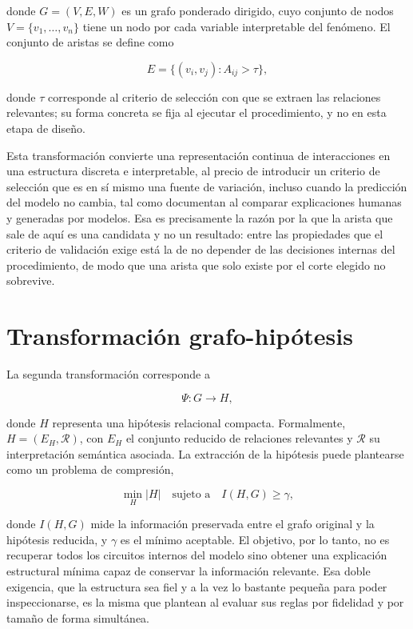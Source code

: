 donde $G = (V, E, W)$ es un grafo ponderado dirigido, cuyo conjunto de nodos $V = \{v_1, \dots, v_n\}$ tiene un nodo por cada variable interpretable del fenómeno. El conjunto de aristas se define como

\begin{equation}
E = \{(v_i, v_j) : A_{ij} > \tau\},
\end{equation}

donde $\tau$ corresponde al criterio de selección con que se extraen las relaciones relevantes; su forma concreta se fija al ejecutar el procedimiento, y no en esta etapa de diseño.

Esta transformación convierte una representación continua de interacciones en una estructura discreta e interpretable, al precio de introducir un criterio de selección que es en sí mismo una fuente de variación, incluso cuando la predicción del modelo no cambia, tal como documentan \textcite{bogaert2026variability} al comparar explicaciones humanas y generadas por modelos. Esa es precisamente la razón por la que la arista que sale de aquí es una candidata y no un resultado: entre las propiedades que el criterio de validación exige está la de no depender de las decisiones internas del procedimiento, de modo que una arista que solo existe por el corte elegido no sobrevive.

\section{Transformación grafo-hipótesis}

La segunda transformación corresponde a

\begin{equation}
\Psi : G \to H,
\end{equation}

donde $H$ representa una hipótesis relacional compacta. Formalmente, $H = (E_H, \mathcal{R})$, con $E_H$ el conjunto reducido de relaciones relevantes y $\mathcal{R}$ su interpretación semántica asociada. La extracción de la hipótesis puede plantearse como un problema de compresión,

\begin{equation}
\min_{H} |H| \quad \text{sujeto a} \quad I(H, G) \geq \gamma,
\end{equation}

donde $I(H,G)$ mide la información preservada entre el grafo original y la hipótesis reducida, y $\gamma$ es el mínimo aceptable. El objetivo, por lo tanto, no es recuperar todos los circuitos internos del modelo sino obtener una explicación estructural mínima capaz de conservar la información relevante. Esa doble exigencia, que la estructura sea fiel y a la vez lo bastante pequeña para poder inspeccionarse, es la misma que plantean \textcite{rulexai2024events} al evaluar sus reglas por fidelidad y por tamaño de forma simultánea.

